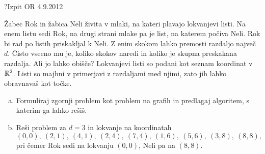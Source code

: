 \begin{naloga}{?}{Izpit OR 4.9.2012}
\begin{vprasanje}
Žabec Rok in žabica Neli živita v mlaki,
na kateri plavajo lokvanjevi listi.
Na enem listu sedi Rok,
na drugi strani mlake pa je list, na katerem počiva Neli.
Rok bi rad po listih priskakljal k Neli.
Z enim skokom lahko premosti razdaljo največ $d$.
Čisto vseeno mu je, koliko skokov naredi
in koliko je skupna preskakana razdalja.
Ali jo lahko obišče?
Lokvanjevi listi so podani kot seznam koordinat v $\mathbb{R}^2$.
Listi so majhni v primerjavi z razdaljami med njimi,
zato jih lahko obravnavaš kot točke.

\begin{enumerate}[(a)]
\item Formuliraj zgornji problem kot problem na grafih in predlagaj algoritem,
s katerim ga lahko rešiš.

\item Reši problem za $d = 3$ in lokvanje na koordinatah
$$
(0, 0), \ (2, 1), \ (4, 1), \ (2, 4), \ (7, 4),
\ (1, 6), \ (5, 6), \ (3, 8), \ (8, 8),
$$
pri čemer Rok sedi na lokvanju $(0, 0)$, Neli pa na $(8, 8)$.
\end{enumerate}
\end{vprasanje}
\begin{odgovor}
\end{odgovor}
\end{naloga}


